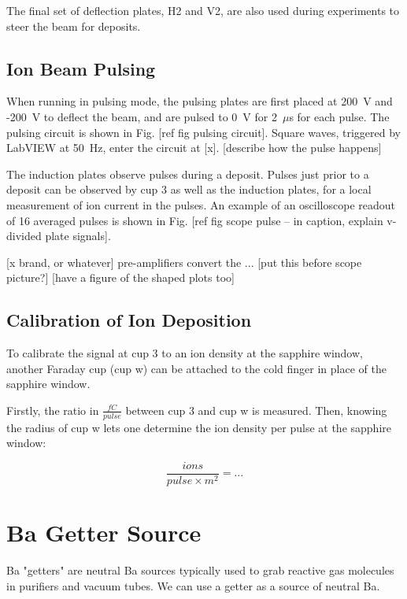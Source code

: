 The final set of deflection plates, H2 and V2, are also used during experiments to steer the beam for deposits.

\subsection{Ion Beam Pulsing}

When running in pulsing mode, the pulsing plates are first placed at 200~V and -200~V to deflect the beam, and are pulsed to 0~V for {\color{red}2~$\mu$s} for each pulse.  The pulsing circuit is shown in Fig. [ref fig pulsing circuit].  Square waves, triggered by LabVIEW at {\color{red}50~Hz}, enter the circuit at [x]. {\color{red}[describe how the pulse happens]}

The induction plates observe pulses during a deposit.  Pulses just prior to a deposit can be observed by cup 3 as well as the induction plates, for a local measurement of ion current in the pulses.  An example of an oscilloscope readout of {\color{red}16} averaged pulses is shown in Fig. [ref fig scope pulse -- in caption, explain v-divided plate signals].  

[x brand, or whatever] pre-amplifiers convert the ... [put this before scope picture?] [have a figure of the shaped plots too]

\subsection{Calibration of Ion Deposition}

To calibrate the signal at cup 3 to an ion density at the sapphire window, another Faraday cup (cup w) can be attached to the cold finger in place of the sapphire window.  

Firstly, the ratio in $\frac{fC}{pulse}$ between cup 3 and cup w is measured.  Then, knowing the radius of cup w lets one determine the ion density per pulse at the sapphire window:

\begin{equation}
\frac{ions}{pulse \times m^{2}} = ...
\label{eqn:ion_density}
\end{equation}

\section{Ba Getter Source}

Ba "getters" are neutral Ba sources typically used to grab reactive gas molecules in purifiers and vacuum tubes.  We can use a getter as a source of neutral Ba.

